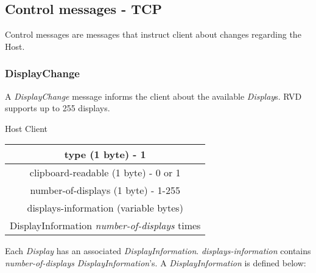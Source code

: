\documentclass[11pt o]{article}
\begin{document}
    \subsection{Control messages - TCP}
    Control messages are messages that instruct client about changes regarding the Host.

    \subsubsection{DisplayChange}
    A \emph{DisplayChange} message informs the client about the available \emph{Display}s. RVD supports up to 255 displays.

    \begin{center}
        Host \textrightarrow Client\\
        \begin{tabular}{|c|}
            \hline
            type (1 byte) - 1                                  \\
            \hline
            clipboard-readable (1 byte) - 0 or 1               \\
            \hline
            number-of-displays (1 byte) - 1-255                \\
            \hline
            displays-information (variable bytes)              \\
            \hline
            DisplayInformation \emph{number-of-displays} times \\
            \hline
        \end{tabular}
    \end{center}

    Each \emph{Display} has an associated \emph{DisplayInformation}. \emph{displays-information} contains \emph{number-of-displays} \emph{DisplayInformation}'s. A \emph{DisplayInformation} is defined below:
\end{document}
